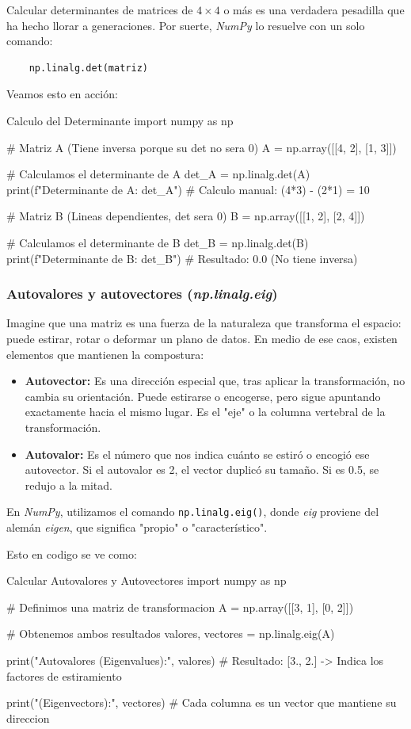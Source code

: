 Calcular determinantes de matrices de \(4 \times 4\) o más es una verdadera pesadilla que ha hecho llorar a generaciones. Por suerte, \textit{NumPy} lo resuelve con un solo comando:
\begin{verbatim}
    np.linalg.det(matriz)
\end{verbatim}

Veamos esto en acción:
\begin{pycode}{Calculo del Determinante}
import numpy as np

# Matriz A (Tiene inversa porque su det no sera 0)
A = np.array([[4, 2], [1, 3]])

# Calculamos el determinante de A
det_A = np.linalg.det(A) 
print(f"Determinante de A: {det_A}") # Calculo manual: (4*3) - (2*1) = 10 

# Matriz B (Lineas dependientes, det sera 0)
B = np.array([[1, 2], [2, 4]])

# Calculamos el determinante de B
det_B = np.linalg.det(B)
print(f"Determinante de B: {det_B}") # Resultado: 0.0 (No tiene inversa)
\end{pycode}

\subsubsection{Autovalores y autovectores (\textit{np.linalg.eig})}

Imagine que una matriz es una fuerza de la naturaleza que transforma el espacio: puede estirar, rotar o deformar un plano de datos. En medio de ese caos, existen elementos que mantienen la compostura:

\begin{itemize}
\item \textbf{Autovector:} Es una dirección especial que, tras aplicar la transformación, no cambia su orientación. Puede estirarse o encogerse, pero sigue apuntando exactamente hacia el mismo lugar. Es el "eje" o la columna vertebral de la transformación.
\item \textbf{Autovalor:} Es el número que nos indica cuánto se estiró o encogió ese autovector. Si el autovalor es 2, el vector duplicó su tamaño. Si es 0.5, se redujo a la mitad.
\end{itemize}

En \textit{NumPy}, utilizamos el comando \texttt{np.linalg.eig()}, donde \textit{eig} proviene del alemán \textit{eigen}, que significa "propio" o "característico".

Esto en codigo se ve como:
\begin{pycode}{Calcular Autovalores y Autovectores}
import numpy as np

# Definimos una matriz de transformacion
A = np.array([[3, 1], [0, 2]])

# Obtenemos ambos resultados
valores, vectores = np.linalg.eig(A)

print("Autovalores (Eigenvalues):", valores) # Resultado: [3., 2.] -> Indica los factores de estiramiento

print("\nAutovectores (Eigenvectors):\n", vectores) # Cada columna es un vector que mantiene su direccion
\end{pycode}


